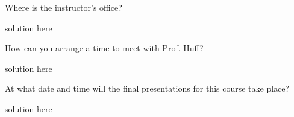 \documentclass[11pt,answers,addpoints]{exam}
\begin{document}
\begin{questions}
        \question[10] Where is the instructor's office?
        \begin{solution}
                solution here
        \end{solution}

        \question[10] How can you arrange a time to meet with Prof. Huff?
        \begin{solution}
                solution here
        \end{solution}

        \question[10] At what date and time will the final presentations for this course take place?
        \begin{solution}
                solution here
        \end{solution}

\end{questions}



%
%
\end{document}
